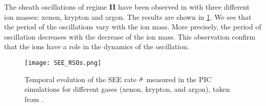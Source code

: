     
    The sheath oscillations of regime {\bf II} have been observed in \citet{croes2017} with three different ion masses: xenon, krypton and argon.
    The results are shown in \cref{fig-RSO_altern}.
    We see that the period of the oscillations vary with the ion mass.
    More precisely, the period of oscillation decreases with the decrease of the ion mass.
    This observation confirm that the ions have a role in the dynamics of the oscillation.
    
    \begin{figure}[hbt]
      \centering
      \texttt{[image: SEE\_RSOs.png]}
      \caption{Temporal evolution of the SEE rate $ \bar{\sigma }$ measured in the PIC simulations for different gases (xenon, krypton, and argon), taken from \citet{croes2017}.}
      \label{fig-RSO_altern}
    \end{figure}
    
    